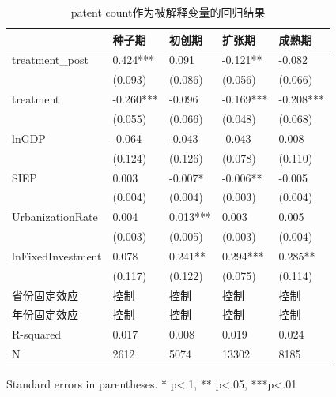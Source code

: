 \begin{table}
\caption{patent count作为被解释变量的回归结果}
\label{}
\begin{center}
\begin{tabular}{lllll}
\hline
                  & 种子期       & 初创期      & 扩张期       & 成熟期        \\
\hline
treatment\_post   & 0.424***  & 0.091    & -0.121**  & -0.082     \\
                  & (0.093)   & (0.086)  & (0.056)   & (0.066)    \\
treatment         & -0.260*** & -0.096   & -0.169*** & -0.208***  \\
                  & (0.055)   & (0.066)  & (0.048)   & (0.068)    \\
lnGDP             & -0.064    & -0.043   & -0.043    & 0.008      \\
                  & (0.124)   & (0.126)  & (0.078)   & (0.110)    \\
SIEP            & 0.003     & -0.007*  & -0.006**  & -0.005     \\
                  & (0.004)   & (0.004)  & (0.003)   & (0.004)    \\
UrbanizationRate              & 0.004     & 0.013*** & 0.003     & 0.005      \\
                  & (0.003)   & (0.005)  & (0.003)   & (0.004)    \\
lnFixedInvestment & 0.078     & 0.241**  & 0.294***  & 0.285**    \\
                  & (0.117)   & (0.122)  & (0.075)   & (0.114)    \\
省份固定效应  & 控制 & 控制 & 控制 & 控制  \\ 
 年份固定效应  & 控制 & 控制 & 控制 & 控制  \\ 
\hline

R-squared         & 0.017     & 0.008    & 0.019     & 0.024      \\
N                 & 2612      & 5074     & 13302     & 8185       \\
\hline
\end{tabular}
\end{center}
\end{table}
\bigskip
Standard errors in parentheses. \newline 
* p<.1, ** p<.05, ***p<.01

